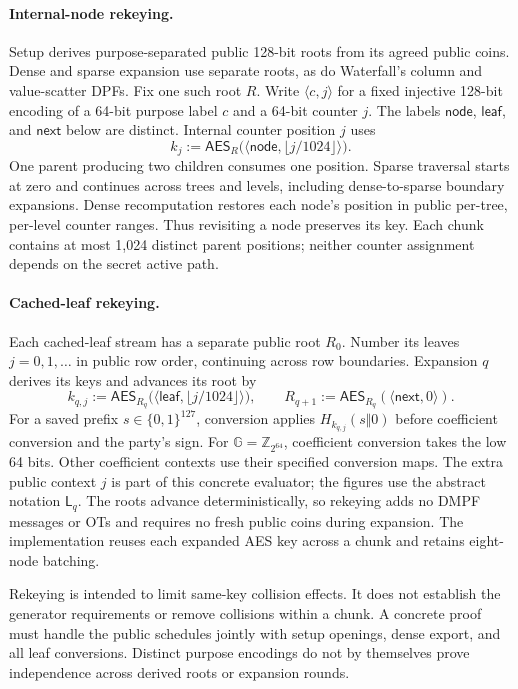 \paragraph{Internal-node rekeying.}
Setup derives purpose-separated public 128-bit roots from its agreed public
coins. Dense and sparse expansion use separate roots, as do Waterfall's
column and value-scatter DPFs. Fix one such root $R$.
Write $\langle c,j\rangle$ for a fixed injective 128-bit encoding of a
64-bit purpose label $c$ and a 64-bit counter $j$.
The labels $\mathsf{node}$, $\mathsf{leaf}$, and $\mathsf{next}$ below are
distinct. Internal counter position $j$ uses
\[
 k_j:=\mathsf{AES}_R\bigl(\langle\mathsf{node},\lfloor j/1024\rfloor\rangle\bigr).
\]
One parent producing two children consumes one position. Sparse traversal
starts at zero and continues across trees and levels, including
dense-to-sparse boundary expansions. Dense recomputation restores each
node's position in public per-tree, per-level counter ranges. Thus revisiting
a node preserves its key. Each chunk contains at most 1,024 distinct parent
positions; neither counter assignment depends on the secret active path.

\paragraph{Cached-leaf rekeying.}
Each cached-leaf stream has a separate public root $R_0$. Number its leaves
$j=0,1,\ldots$ in public row order, continuing across row boundaries.
Expansion $q$ derives its keys and advances its root by
\[
 k_{q,j}:=\mathsf{AES}_{R_q}
     \bigl(\langle\mathsf{leaf},\lfloor j/1024\rfloor\rangle\bigr),
 \qquad
 R_{q+1}:=\mathsf{AES}_{R_q}(\langle\mathsf{next},0\rangle).
\]
For a saved prefix $s\in\{0,1\}^{127}$, conversion applies
$H_{k_{q,j}}(s\Vert0)$ before coefficient conversion and the party's sign.
For $\mathbb G=\mathbb Z_{2^{64}}$, coefficient conversion takes the low
64 bits. Other coefficient contexts use their specified conversion maps.
The extra public context $j$ is part of this concrete evaluator; the
figures use the abstract notation $\mathsf L_q$.
The roots advance deterministically, so rekeying adds no DMPF messages or
OTs and requires no fresh public coins during expansion. The implementation
reuses each expanded AES key across a chunk and retains eight-node batching.

Rekeying is intended to limit same-key collision effects. It does not
establish the generator requirements or remove collisions within a chunk. A concrete
proof must handle the public schedules jointly with setup openings, dense
export, and all leaf conversions. Distinct purpose encodings do not by
themselves prove independence across derived roots or expansion rounds.
